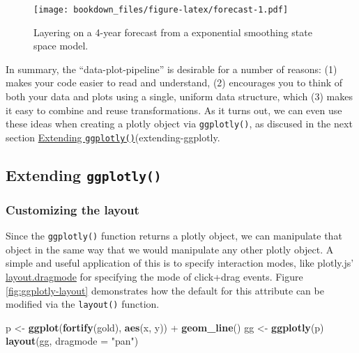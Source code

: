\documentclass[12pt,]{isuthesis}
\newenvironment{Shaded}{\begin{snugshade}}{\end{snugshade}}
\newcommand{\KeywordTok}[1]{\textcolor[rgb]{0.13,0.29,0.53}{\textbf{{#1}}}}
\newcommand{\DataTypeTok}[1]{\textcolor[rgb]{0.13,0.29,0.53}{{#1}}}
\newcommand{\StringTok}[1]{\textcolor[rgb]{0.31,0.60,0.02}{{#1}}}
\newcommand{\NormalTok}[1]{{#1}}
\begin{document}
\begin{figure}[htbp]
\centering
\texttt{[image: bookdown\_files/figure-latex/forecast-1.pdf]}
\caption{\label{fig:forecast}Layering on a 4-year forecast from a
exponential smoothing state space model.}
\end{figure}

In summary, the ``data-plot-pipeline'' is desirable for a number of
reasons: (1) makes your code easier to read and understand, (2)
encourages you to think of both your data and plots using a single,
uniform data structure, which (3) makes it easy to combine and reuse
transformations. As it turns out, we can even use these ideas when
creating a plotly object via \texttt{ggplotly()}, as discused in the
next section \protect\hyperlink{extending-ggplotly}{Extending
\texttt{ggplotly()}}(extending-ggplotly.

\hypertarget{extending-ggplotly}{\subsection{\texorpdfstring{Extending
\texttt{ggplotly()}}{Extending ggplotly()}}\label{extending-ggplotly}}

\subsubsection{Customizing the layout}\label{customizing-the-layout}

Since the \texttt{ggplotly()} function returns a plotly object, we can
manipulate that object in the same way that we would manipulate any
other plotly object. A simple and useful application of this is to
specify interaction modes, like plotly.js'
\href{https://plot.ly/r/reference/\#layout-dragmode}{layout.dragmode}
for specifying the mode of click+drag events. Figure
\ref{fig:ggplotly-layout} demonstrates how the default for this
attribute can be modified via the \texttt{layout()} function.

\begin{Shaded}
\begin{Highlighting}[]
\NormalTok{p <-}\StringTok{ }\KeywordTok{ggplot}\NormalTok{(}\KeywordTok{fortify}\NormalTok{(gold), }\KeywordTok{aes}\NormalTok{(x, y)) +}\StringTok{ }\KeywordTok{geom_line}\NormalTok{()}
\NormalTok{gg <-}\StringTok{ }\KeywordTok{ggplotly}\NormalTok{(p)}
\KeywordTok{layout}\NormalTok{(gg, }\DataTypeTok{dragmode =} \StringTok{"pan"}\NormalTok{)}
\end{Highlighting}
\end{Shaded}
\end{document}
